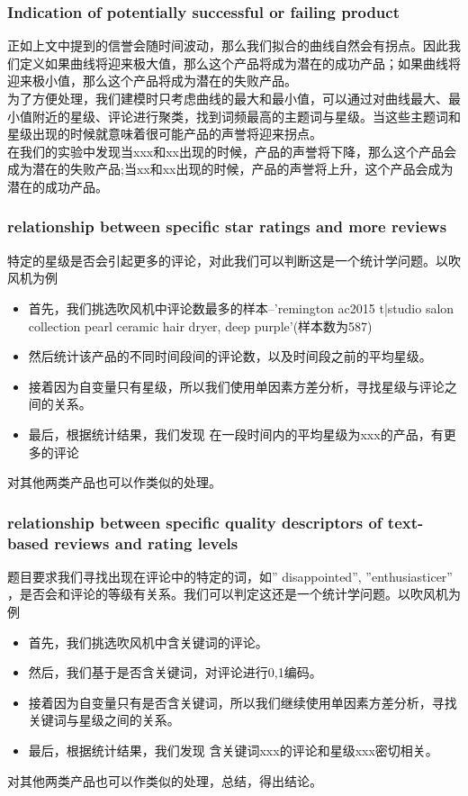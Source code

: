 \documentclass{mcmthesis}
\begin{document}
\subsubsection{Indication of potentially successful or failing product}
正如上文中提到的信誉会随时间波动，那么我们拟合的曲线自然会有拐点。因此我们定义如果曲线将迎来极大值，那么这个产品将成为潜在的成功产品；如果曲线将迎来极小值，那么这个产品将成为潜在的失败产品。\\

为了方便处理，我们建模时只考虑曲线的最大和最小值，可以通过对曲线最大、最小值附近的星级、评论进行聚类，找到词频最高的主题词与星级。当这些主题词和星级出现的时候就意味着很可能产品的声誉将迎来拐点。\\

在我们的实验中发现当xxx和xx出现的时候，产品的声誉将下降，那么这个产品会成为潜在的失败产品;当xx和xx出现的时候，产品的声誉将上升，这个产品会成为潜在的成功产品。

\subsubsection{relationship between specific star ratings and more reviews}
特定的星级是否会引起更多的评论，对此我们可以判断这是一个统计学问题。以吹风机为例
\begin{itemize}
	\item 首先，我们挑选吹风机中评论数最多的样本--'remington ac2015 t|studio salon collection pearl ceramic hair dryer, deep purple'(样本数为587)
	\item 然后统计该产品的不同时间段间的评论数，以及时间段之前的平均星级。
	\item 接着因为自变量只有星级，所以我们使用单因素方差分析，寻找星级与评论之间的关系。
	\item 最后，根据统计结果，我们发现
	在一段时间内的平均星级为xxx的产品，有更多的评论
\end{itemize}
对其他两类产品也可以作类似的处理。

\subsubsection{relationship between specific quality descriptors of text-based reviews and rating levels}
题目要求我们寻找出现在评论中的特定的词，如” disappointed”, ”enthusiasticer” ，是否会和评论的等级有关系。我们可以判定这还是一个统计学问题。以吹风机为例
\begin{itemize}
	\item 首先，我们挑选吹风机中含关键词的评论。
	\item 然后，我们基于是否含关键词，对评论进行0,1编码。
	\item 接着因为自变量只有是否含关键词，所以我们继续使用单因素方差分析，寻找关键词与星级之间的关系。
	\item 最后，根据统计结果，我们发现
	含关键词xxx的评论和星级xxx密切相关。
\end{itemize}
对其他两类产品也可以作类似的处理，总结，得出结论。
\end{document}
